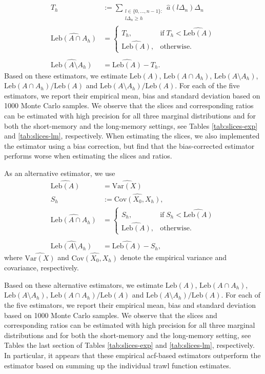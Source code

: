 \documentclass{article}
\theoremstyle{plain}
\theoremstyle{definition}
\theoremstyle{remark}
\newcommand{\Var}{\ensuremath{\mathrm{Var}}}
\newcommand{\Leb}{\ensuremath{\mathrm{Leb}}}
\begin{document}
\begin{appendix}
\begin{align*}
	T_h&:=
	\sum_{\substack{l\in \{0, \ldots, n-1\}:\\ l\Delta_n \geq h}} \hat a(l\Delta_n)\Delta_n\\
	\widehat{	\Leb(A\cap A_h)} &=
	\left\{ \begin{array}{ll}
		T_h,& \mathrm{if} \; T_h< 	\widehat{\Leb(A)}\\
		\widehat{\Leb(A)}, & \mathrm{otherwise}.
	\end{array}\right. \\
	\\
	\widehat{\Leb(A\setminus A_h)}&=\widehat{\Leb(A)}-T_h.
\end{align*}
Based on these estimators, we  estimate 
$\mathrm{\Leb}(A)$, $\mathrm{\Leb}(A\cap A_h)$, 
$\mathrm{\Leb}(A \setminus A_h)$, $\mathrm{\Leb}(A\cap A_h)/\mathrm{\Leb}(A)$ and  $\mathrm{\Leb}(A \setminus A_h)/\mathrm{\Leb}(A)$. 
For each of the five estimators, we report their empirical mean, bias and standard deviation based on 1000 Monte Carlo samples. 
We observe that the slices and corresponding ratios can be estimated 
with high precision for all three marginal distributions and for both the short-memory and the long-memory settings, see Tables \ref{tab:slices-exp} and \ref{tab:slices-lm}, respectively. 
When estimating the slices, we also implemented the estimator using a bias correction, but find that the bias-corrected estimator performs worse when estimating the slices and ratios.

As an alternative estimator, we use
\begin{align*}
	\widehat{\Leb(A)}&=\widehat{\Var(X)}
	\\
	S_h & := \widehat{\mathrm{Cov}(X_0, X_h)},\\
	\widehat{	\Leb(A\cap A_h)} &=\left\{ \begin{array}{ll}
		S_h,& \mathrm{if} \; S_h< 	\widehat{\Leb(A)}\\
		\widehat{\Leb(A)}, & \mathrm{otherwise}.
	\end{array}\right. \\
	\\
	\widehat{\Leb(A\setminus A_h)}&=\widehat{\Leb(A)}-S_h,
	\end{align*}
where $\widehat{\Var(X)}$ and $\widehat{\mathrm{Cov}(X_0, X_h)}$ denote the empirical variance and covariance, respectively.


Based on these alternative estimators, we  estimate 
$\mathrm{\Leb}(A)$, $\mathrm{\Leb}(A\cap A_h)$, 
$\mathrm{\Leb}(A \setminus A_h)$, $\mathrm{\Leb}(A\cap A_h)/\mathrm{\Leb}(A)$ and  $\mathrm{\Leb}(A \setminus A_h)/\mathrm{\Leb}(A)$. 
For each of the five estimators, we report their empirical mean, bias and standard deviation based on 1000 Monte Carlo samples. 
We observe that the slices and corresponding ratios can be estimated 
with high precision for all three marginal distributions and for both the short-memory and the long-memory setting, see Tables the last section of Tables
\ref{tab:slices-exp} and \ref{tab:slices-lm}, 
respectively.  
In particular, it appears that these empirical acf-based estimators outperform the estimator based on summing up the individual trawl function estimates.



\end{appendix}
\end{document}
